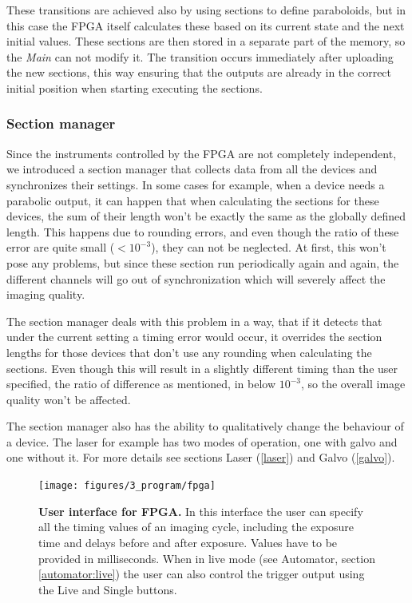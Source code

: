 \documentclass{tdk_style}
\begin{document}
These transitions are achieved also by using sections to define paraboloids, but in this case the FPGA itself calculates these based on its current state and the next initial values. These sections are then stored in a separate part of the memory, so the \emph{Main} can not modify it. The transition occurs immediately after uploading the new sections, this way ensuring that the outputs are already in the correct initial position when starting executing the sections.

\subsubsection{Section manager}
\label{section_manager}
Since the instruments controlled by the FPGA are not completely independent, we introduced a section manager that collects data from all the devices and synchronizes their settings. In some cases for example, when a device needs a parabolic output, it can happen that when calculating the sections for these devices, the sum of their length won't be exactly the same as the globally defined length. This happens due to rounding errors, and even though the ratio of these error are quite small ($<10^{-3}$), they can not be neglected. At first, this won't pose any problems, but since these section run periodically again and again, the different channels will go out of synchronization which will severely affect the imaging quality.

The section manager deals with this problem in a way, that if it detects that under the current setting a timing error would occur, it overrides the section lengths for those devices that don't use any rounding when calculating the sections. Even though this will result in a slightly different timing than the user specified, the ratio of difference as mentioned, in below $10^{-3}$, so the overall image quality won't be affected.

The section manager also has the ability to qualitatively change the behaviour of a device. The laser for example has two modes of operation, one with galvo and one without it. For more details see sections Laser (\ref{laser}) and Galvo (\ref{galvo}).

\begin{figure}[htbp]
	\centering
	\texttt{[image: figures/3\_program/fpga]}
	\caption{\textbf{User interface for FPGA.} In this interface the user can specify all the timing values of an imaging cycle, including the exposure time and delays before and after exposure. Values have to be provided in milliseconds. When in live mode (see Automator, section \ref{automator:live}) the user can also control the trigger output using the Live and Single buttons.}
	\label{fig:ui_fpga}
\end{figure}
\end{document}

